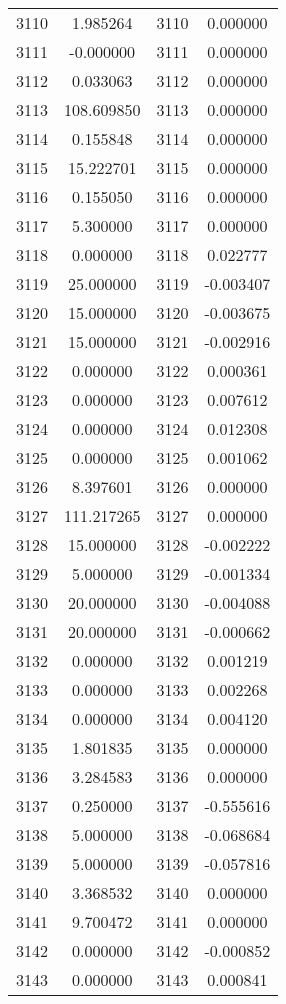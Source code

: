 \documentclass[12pt]{article}
\begin{document}
\begin{longtable}{@{}cccc@{}}
3110 & 1.985264 & 3110 & 0.000000 \\
3111 & -0.000000 & 3111 & 0.000000 \\
3112 & 0.033063 & 3112 & 0.000000 \\
3113 & 108.609850 & 3113 & 0.000000 \\
3114 & 0.155848 & 3114 & 0.000000 \\
3115 & 15.222701 & 3115 & 0.000000 \\
3116 & 0.155050 & 3116 & 0.000000 \\
3117 & 5.300000 & 3117 & 0.000000 \\
3118 & 0.000000 & 3118 & 0.022777 \\
3119 & 25.000000 & 3119 & -0.003407 \\
3120 & 15.000000 & 3120 & -0.003675 \\
3121 & 15.000000 & 3121 & -0.002916 \\
3122 & 0.000000 & 3122 & 0.000361 \\
3123 & 0.000000 & 3123 & 0.007612 \\
3124 & 0.000000 & 3124 & 0.012308 \\
3125 & 0.000000 & 3125 & 0.001062 \\
3126 & 8.397601 & 3126 & 0.000000 \\
3127 & 111.217265 & 3127 & 0.000000 \\
3128 & 15.000000 & 3128 & -0.002222 \\
3129 & 5.000000 & 3129 & -0.001334 \\
3130 & 20.000000 & 3130 & -0.004088 \\
3131 & 20.000000 & 3131 & -0.000662 \\
3132 & 0.000000 & 3132 & 0.001219 \\
3133 & 0.000000 & 3133 & 0.002268 \\
3134 & 0.000000 & 3134 & 0.004120 \\
3135 & 1.801835 & 3135 & 0.000000 \\
3136 & 3.284583 & 3136 & 0.000000 \\
3137 & 0.250000 & 3137 & -0.555616 \\
3138 & 5.000000 & 3138 & -0.068684 \\
3139 & 5.000000 & 3139 & -0.057816 \\
3140 & 3.368532 & 3140 & 0.000000 \\
3141 & 9.700472 & 3141 & 0.000000 \\
3142 & 0.000000 & 3142 & -0.000852 \\
3143 & 0.000000 & 3143 & 0.000841 \\

\end{longtable}
\end{document}
